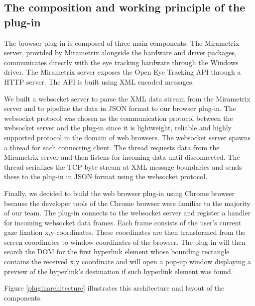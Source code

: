 \documentclass[english]{tktltiki}
\begin{document}
\subsection{The composition and working principle of the plug-in}

The browser plug-in is composed of three main components. The Mirametrix server, provided by Mirametrix alongside the hardware and driver packages, communicates directly with the eye tracking hardware through the Windows driver. The Mirametrix server exposes the Open Eye Tracking API through a HTTP server. The API is built using XML encoded messages.

We built a websocket server to parse the XML data stream from the Mirametrix server and to pipeline the data in JSON format to our browser plug-in. The websocket protocol was chosen as the communication protocol between the websocket server and the plug-in since it is lightweight, reliable and highly supported protocol in the domain of web browsers. The websocket server spawns a thread for each connecting client. The thread requests data from the Mirametrix server and then listens for incoming data until disconnected. The thread serializes the TCP byte stream at XML message boundaries and sends these to the plug-in in JSON format using the websocket protocol.  

Finally, we decided to build the web browser plug-in using Chrome browser because the developer tools of the Chrome browser were familiar to the majority of our team. The plug-in connects to the websocket server and register a handler for incoming websocket data frames. Each frame consists of the user's current gaze fixation x,y-coordinates. These coordinates are then transformed from the screen coordinates to window coordinates of the browser. The plug-in will then search the DOM for the first hyperlink element whose bounding rectangle contains the received x,y coordinate and will open a pop-up window displaying a preview of the hyperlink's destination if such hyperlink element was found.

Figure \ref{pluginarchitecture} illustrates this architecture and layout of the components.
\end{document}
